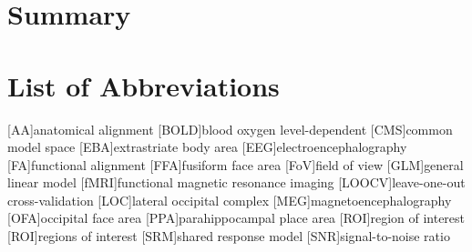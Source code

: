 \documentclass[english,12pt]{report}
\begin{document}
\begin{spacing}{1.5}





\chapter*{Summary}





\chapter*{List of Abbreviations}



\renewcommand{\baselinestretch}{0.75}\normalsize

\begin{acronym}[longest]
    [AA]{anatomical alignment}
    [BOLD]{blood oxygen level-dependent}
    [CMS]{common model space}
    [EBA]{extrastriate body area}
    [EEG]{electroencephalography}
    [FA]{functional alignment}
    [FFA]{fusiform face area}
    [FoV]{field of view}
    [GLM]{general linear model}
    [fMRI]{functional magnetic resonance imaging}
    [LOOCV]{leave-one-out cross-validation}
    [LOC]{lateral occipital complex}
    [MEG]{magnetoencephalography}
    [OFA]{occipital face area}
    [PPA]{parahippocampal place area}
    [ROI]{region of interest}
    [ROI]{regions of interest}
    [SRM]{shared response model}
    [SNR]{signal-to-noise ratio}
\end{acronym}


\end{spacing}
\end{document}

